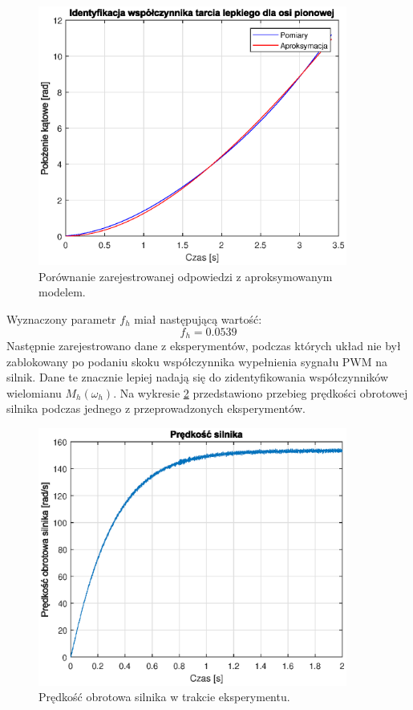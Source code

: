 \documentclass[11pt,a4paper]{article}
\begin{document}
\begin{figure}[H]
	\centering
	\includegraphics[width=4in]{Figures/ident_J_h.eps}
	\caption{Porównanie zarejestrowanej odpowiedzi z aproksymowanym modelem.}
	\label{fig:ident_J_h}
\end{figure}

Wyznaczony parametr \(f_h\) miał następującą wartość:
\begin{equation}
f_h = 0.0539
\end{equation}
Następnie zarejestrowano dane z eksperymentów, podczas których układ nie był zablokowany po podaniu skoku współczynnika wypełnienia sygnału PWM na silnik. Dane te znacznie lepiej nadają się do zidentyfikowania współczynników wielomianu \(M_h(\omega_h)\). Na wykresie \ref{fig:V_ident_M_h} przedstawiono przebieg prędkości obrotowej silnika podczas jednego z przeprowadzonych eksperymentów.

\begin{figure}[H]
	\centering
	\includegraphics[width=4in]{Figures/V_ident_M_h.eps}
	\caption{Prędkość obrotowa silnika w trakcie eksperymentu.}
	\label{fig:V_ident_M_h}
\end{figure}
\end{document}
